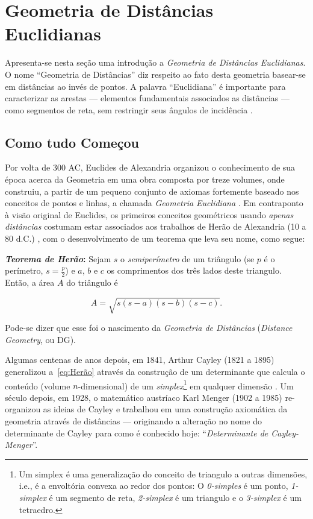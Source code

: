\section{Geometria de Distâncias Euclidianas\label{sec:GD}}
Apresenta-se nesta seção uma introdução a \textit{Geometria de Distâncias Euclidianas}. O nome ``Geometria de Distâncias'' diz respeito ao fato desta geometria basear-se em distâncias ao invés de pontos. A palavra ``Euclidiana'' é importante para caracterizar as arestas --- elementos fundamentais associados as distâncias --- como segmentos de reta, sem restringir seus ângulos de incidência \cite{libertiEDG}.

\subsection{Como tudo Começou}

Por volta de 300 AC, Euclides de Alexandria organizou o conhecimento de sua época acerca da Geometria em uma obra composta por treze volumes, onde construiu, a partir de um pequeno conjunto de axiomas fortemente baseado nos conceitos de pontos e linhas, a chamada \textit{Geometria Euclidiana} \cite{elementosEuclides}. Em contraponto à visão original de Euclides, os primeiros conceitos geométricos usando \textit{apenas distâncias} costumam estar associados aos trabalhos de Herão de Alexandria (10 a 80 d.C.) \cite{libertiEDG}, com o desenvolvimento de um teorema que leva seu nome, como segue: 
\begin{center}
	\begin{minipage}{0.9 \linewidth}
		\textbf{\textit{Teorema de Herão}:} Sejam $s$ o \textit{semiperímetro} de um triângulo (se $p$ é o perímetro, $s = \frac{p}{2}$) e $a$, $b$ e $c$ os comprimentos dos três lados deste triangulo. Então, a área $A$ do triângulo é
		
		\begin{equation}\tag{Fórmula de Herão}
		A = \sqrt{s(s-a)(s-b)(s-c)}.
		\label{eq:Herão}
		\end{equation}
	\end{minipage}
\end{center} 
Pode-se dizer que esse foi o nascimento da \textit{Geometria de Distâncias} (\textit{Distance Geometry}, ou DG).

Algumas centenas de anos depois, em 1841, Arthur Cayley (1821 a 1895) generalizou a~\ref{eq:Herão} através da construção de um determinante que calcula o conteúdo (volume $n$-dimensional) de um \textit{simplex}\footnote{Um simplex é uma generalização do conceito de triangulo a outras dimensões, i.e., é a envoltória convexa ao redor dos pontos: O \textit{0-simples} é um ponto, \textit{1-simplex} é um segmento de reta, \textit{2-simplex} é um triangulo e o \textit{3-simplex} é um tetraedro.} em qualquer dimensão \cite{cayley1841HaronGD, douglasGD}. Um século depois, em 1928, o matemático austríaco Karl Menger (1902 a 1985) re-organizou as ideias de Cayley e trabalhou em uma construção axiomática da geometria através de distâncias \cite{mengerDeterminante} --- originando a alteração no nome do determinante de Cayley para como é conhecido hoje: ``\textit{Determinante de Cayley-Menger}''.  

